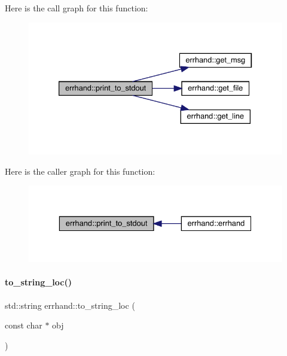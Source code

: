 Here is the call graph for this function\+:\nopagebreak
\begin{figure}[H]
\begin{center}
\leavevmode
\includegraphics[width=333pt]{classerrhand_a5b4d8a74f1d0c6842526dc8b54e38dc2_cgraph}
\end{center}
\end{figure}
Here is the caller graph for this function\+:\nopagebreak
\begin{figure}[H]
\begin{center}
\leavevmode
\includegraphics[width=329pt]{classerrhand_a5b4d8a74f1d0c6842526dc8b54e38dc2_icgraph}
\end{center}
\end{figure}
\mbox{\label{classerrhand_a930df1c197154853159683cb2ad55369}} 
\paragraph{\texorpdfstring{to\+\_\+string\+\_\+loc()}{to\_string\_loc()}}
{\footnotesize\ttfamily std\+::string errhand\+::to\+\_\+string\+\_\+loc (\begin{DoxyParamCaption}\item[{const char $\ast$}]{obj }\end{DoxyParamCaption})\hspace{0.3cm}{\ttfamily [inline]}}

